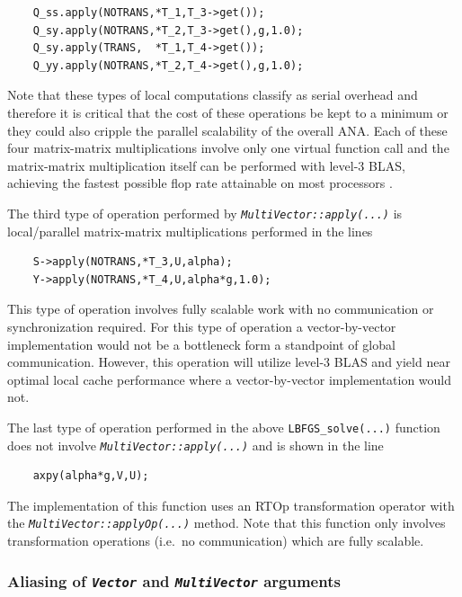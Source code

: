 {\tiny\begin{verbatim}
    Q_ss.apply(NOTRANS,*T_1,T_3->get());
    Q_sy.apply(NOTRANS,*T_2,T_3->get(),g,1.0);
    Q_sy.apply(TRANS,  *T_1,T_4->get());
    Q_yy.apply(NOTRANS,*T_2,T_4->get(),g,1.0);
\end{verbatim}}

Note that these types of local computations classify as serial
overhead and therefore it is critical that the cost of these
operations be kept to a minimum or they could also cripple the
parallel scalability of the overall ANA.  Each of these four
matrix-matrix multiplications involve only one virtual function call
and the matrix-matrix multiplication itself can be performed with
level-3 BLAS, achieving the fastest possible flop rate attainable on
most processors \cite{ref:demmel_1997}.

The third type of operation performed by
\texttt{\textit{Multi\-Vector\-::apply(\-...)}} is local/parallel matrix-matrix
multiplications performed in the lines

{\tiny\begin{verbatim}
    S->apply(NOTRANS,*T_3,U,alpha);
    Y->apply(NOTRANS,*T_4,U,alpha*g,1.0);
\end{verbatim}}

This type of operation involves fully scalable work with no
communication or synchronization required.  For this type of operation
a vector-by-vector implementation would not be a bottleneck form a
standpoint of global communication.  However, this operation will
utilize level-3 BLAS and yield near optimal local cache performance
where a vector-by-vector implementation would not.

The last type of operation performed in the above
\texttt{LBFGS\_solve(...)}  function does not involve
\texttt{\textit{Multi\-Vector\-::apply(\-...)}} and is shown in the line

{\tiny\begin{verbatim}
    axpy(alpha*g,V,U);
\end{verbatim}}

The implementation of this function uses an RTOp transformation
operator with the \texttt{\textit{Multi\-Vector\-::applyOp(\-...)}}
method.  Note that this function only involves transformation
operations (i.e.~no communication) which are fully scalable.

%
\subsubsection{Aliasing of \texttt{\textit{Vector}} and \texttt{\textit{Multi\-Vector}} arguments}
\label{tsfcore:sec:aliasing}
%

